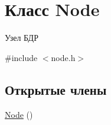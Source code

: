 \hypertarget{class_node}{}\section{Класс Node}
\label{class_node}


Узел БДР  




{\ttfamily \#include $<$node.\+h$>$}

\subsection*{Открытые члены}
\begin{DoxyCompactItemize}
\item 
\hyperlink{class_node_ad7a34779cad45d997bfd6d3d8043c75f}{Node} ()\hypertarget{class_node_ad7a34779cad45d997bfd6d3d8043c75f}{}\label{class_node_ad7a34779cad45d997bfd6d3d8043c75f}


\end{DoxyCompactItemize}
